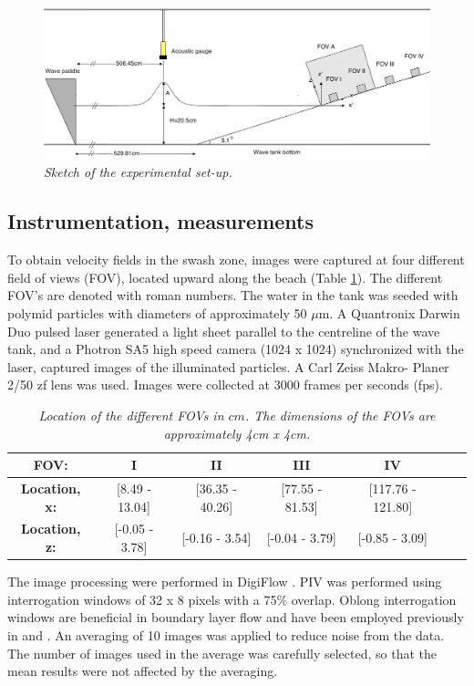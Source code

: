 \documentclass[review]{elsarticle}
\begin{document}
\begin{figure}[]
\centering
\includegraphics[width=\textwidth]{./Figures/setup3.png}
\caption{\textit{ Sketch of  the experimental set-up.}}
\label{fig:beach_tegning}
\end{figure}

\subsection{Instrumentation, measurements}
\label{ins_measure}
To obtain velocity fields in the swash zone, images were captured at four different field of views (FOV), located upward along the beach (Table \ref{tab:loc}). The different FOV's are denoted with roman numbers. The water in the tank was seeded with polymid particles with diameters of approximately 50 $\mu$m. A Quantronix Darwin Duo pulsed laser generated a light sheet parallel to the centreline of the wave tank, and a Photron SA5 high speed camera (1024 x 1024) synchronized with the laser, captured images of the illuminated particles. A Carl Zeiss Makro- Planer 2/50 zf lens was used. Images were collected at 3000 frames per seconds (fps).
 \begin{table}[]
 \centering
\caption{\textit{Location of the different FOVs  in $cm$. The dimensions of the FOVs are approximately 4cm x 4cm.}}
\begin{tabular}{|c|c|c|c|c|c|c|}
\hline
\textbf{FOV:}      & I                   & II                 & III     & IV \\ \hline
\textbf{Location, x:}& {[}8.49 - 13.04{]} & {[}36.35 - 40.26{]} & {[}77.55 - 81.53{]} & {[}117.76 - 121.80{]} 
 \\ \hline
\textbf{Location, z:}&  {[}-0.05 - 3.78{]} & {[}-0.16 - 3.54{]} & {[}-0.04 - 3.79{]} & {[}-0.85 - 3.09{]} 
\\ \hline
\end{tabular}
\label{tab:loc}
\end{table}
The image processing were performed in DigiFlow \citep{digiflow}. PIV was performed using interrogation windows of 32 x 8 pixels with a 75\% overlap. Oblong interrogation windows are beneficial in boundary layer flow and have been employed previously in \cite{liu2007boundary} and \cite{pedersen2013runup}. An averaging of 10 images was applied to reduce noise from the data. The number of images used in the average was carefully selected, so that the mean results were not affected by the averaging. 
\end{document}
